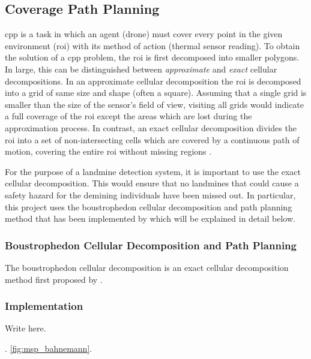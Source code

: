 \subsection{Coverage Path Planning}
\label{sec:msp_cpp}

\gls{cpp} is a task in which an agent (drone) must cover every point in the given environment (\gls{roi}) with its method of action (thermal sensor reading). To obtain the solution of a \gls{cpp} problem, the \gls{roi} is first decomposed into smaller polygons. In large, this can be distinguished between \textit{approximate} and \textit{exact} cellular decompositions. In an approximate cellular decomposition the \gls{roi} is decomposed into a grid of same size and shape (often a square). Assuming that a single grid is smaller than the size of the sensor's field of view, visiting all grids would indicate a full coverage of the \gls{roi} except the areas which are lost during the approximation process. In contrast, an exact cellular decomposition divides the \gls{roi} into a set of non-intersecting cells which are covered by a continuous path of motion, covering the entire \gls{roi} without missing regions \cite{choset2001surveycpp}. 

For the purpose of a landmine detection system, it is important to use the exact cellular decomposition. This would ensure that no landmines that could cause a safety hazard for the demining individuals have been missed out. In particular, this project uses the boustrophedon cellular decomposition and path planning method that has been implemented by \cite{bahnemann2021cpp} which will be explained in detail below.  

\subsubsection{Boustrophedon Cellular Decomposition and Path Planning}

The boustrophedon cellular decomposition is an exact cellular decomposition method first proposed by \cite{choset1998bcd}. 

\subsubsection{Implementation}

Write here. 

\cite{bahnemann2021cpp}. \ref{fig:msp_bahnemann}.

